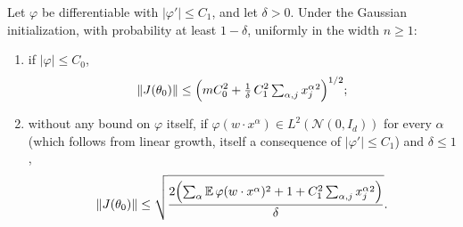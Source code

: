 \begin{theorem}\label{thm:ntktl:jacobianConcentration}
  \leanok
Let $\varphi$ be differentiable with $|\varphi'|\le C_1$, and let $\delta>0$. Under the Gaussian initialization, with probability at least $1-\delta$, uniformly in the width $n\ge1$:
\begin{enumerate}
  \item if $|\varphi|\le C_0$,
        \[
          \|J(\theta_0)\|\le\Bigl(mC_0^2+\tfrac1\delta\,C_1^2\textstyle\sum_{\alpha,j}x^\alpha_j{}^2\Bigr)^{1/2};
        \]
  \item without any bound on $\varphi$ itself, if $\varphi(w\cdot x^\alpha)\in L^2(\mathcal N(0,I_d))$ for every $\alpha$ (which follows from linear growth, itself a consequence of $|\varphi'|\le C_1$) and $\delta\le1$,
        \[
          \|J(\theta_0)\|\le\sqrt{\frac{2\Bigl(\sum_\alpha\mathbb E\,\varphi(w\cdot x^\alpha)^2+1+C_1^2\sum_{\alpha,j}x^\alpha_j{}^2\Bigr)}{\delta}} .
        \]
\end{enumerate}
\end{theorem}

